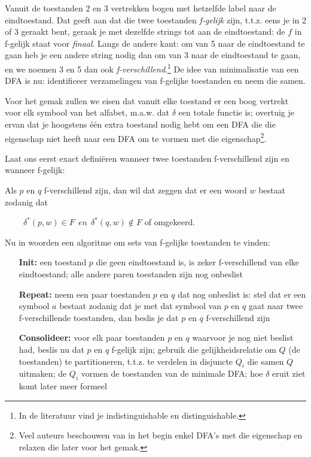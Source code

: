 Vanuit de toestanden 2 en 3 vertrekken bogen met hetzelfde label naar
de eindtoestand. Dat geeft aan dat die twee toestanden {\em f-gelijk}
zijn, t.t.z. eens je in 2 of 3 geraakt bent, geraak je met dezelfde
strings tot aan de eindtoestand: de $f$ in f-gelijk staat voor {\em
finaal}. Langs de andere kant: om van 5 naar de eindtoestand te gaan
heb je een andere string nodig dan om van 3 naar de eindtoestand te
gaan, en we noemen 3 en 5 dan ook {\em f-verschillend}.\footnote{In de
literatuur vind je indistinguishable en distinguishable.} De idee van
minimalisatie van een DFA is nu: identificeer verzamelingen van
f-gelijke toestanden en neem die samen.


Voor het gemak zullen we eisen dat vanuit elke toestand er een boog
vertrekt voor elk symbool van het alfabet, m.a.w. dat $\delta$ een
totale functie is; overtuig je ervan dat je hoogstens \'{e}\'{e}n
extra toestand nodig hebt om een DFA die die eigenschap niet heeft
naar een DFA om te vormen met die eigenschap\footnote{Veel auteurs
beschouwen van in het begin enkel DFA's met die eigenschap en relaxen
die later voor het gemak.}.


Laat ons eerst exact defini\"eren wanneer twee toestanden f-verschillend
zijn en wanneer f-gelijk:



Als $p$ en $q$ f-verschillend zijn, dan wil dat zeggen dat er een woord $w$
bestaat zodanig dat

$~~~~~~~~~~\delta^*(p,w) \in F~~en~~ \delta^*(q,w) \notin F$ of omgekeerd.


Nu in woorden een algoritme om sets van f-gelijke toestanden te vinden:
\begin{itemize}
\item[{\bf Init:}]
een toestand $p$ die geen eindtoestand is, is zeker f-verschillend
van elke eindtoestand; alle andere paren toestanden zijn nog onbeslist

\item[{\bf Repeat:}]
neem een paar toestanden $p$ en $q$ dat nog onbeslist is: stel dat er een
symbool $a$ bestaat zodanig dat je met dat symbool van $p$ en $q$ gaat naar
twee f-verschillende toestanden, dan beslis je dat $p$ en $q$ f-verschillend
zijn

\item[{\bf Consolideer:}]
voor elk paar toestanden $p$ en $q$ waarvoor je nog niet beslist had,
beslis nu dat $p$ en $q$ f-gelijk zijn; gebruik die gelijkheidsrelatie
om $Q$ (de toestanden) te partitioneren, t.t.z. te verdelen in
disjuncte $Q_i$ die samen $Q$ uitmaken; de $Q_i$ vormen de toestanden
van de minimale DFA; hoe $\delta$ eruit ziet komt later meer formeel

\end{itemize}


